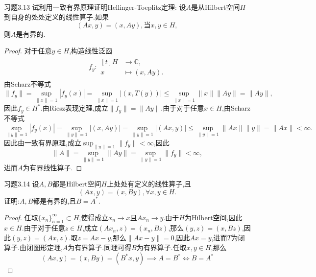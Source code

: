 \documentclass[lang = cn, scheme = chinese]{elegantbook}
\begin{document}
	\chapter{}
	
	\begin{proposition}{习题3.13}
		试利用一致有界原理证明Hellinger-Toeplitz定理:
		设$A$是从Hilbert空间$H$到自身的处处定义的线性算子.如果
		$$
		(Ax,y)=(x,Ay),\text{当}x,y\in H,
		$$
		则$A$是有界的.
	\end{proposition}
	
	\begin{proof}
		对于任意$y\in H $,构造线性泛函
		\begin{align*}
			f_y:\begin{aligned}[t]
				H &\longrightarrow \mathbb{C},\\
				x&\longmapsto (x,Ay).
			\end{aligned}
		\end{align*}
		由Scharz不等式
		$$
		\|f_y\|=\sup_{\|x\|=1}|f_y(x)|=\sup_{\|x\|=1}|(x,T(y))|\le \sup_{\|x\|=1}\|x\|\|Ay\|=\|Ay\|,
		$$
		因此$f_y\in H ^*$.由Riesz表现定理,成立$\|f_y\|=\|Ay\|$.由于对于任意$x\in H $,由Scharz不等式
		$$
		\sup_{\|y\|=1}|f_y(x)|
		=\sup_{\|y\|=1}|(x,Ay)|
		=\sup_{\|y\|=1}|(Ax,y)|
		\le\sup_{\|y\|=1}\|Ax\|\|y\|
		=\|Ax\|<\infty.
		$$
		因此由一致有界原理,成立$\displaystyle\sup_{\|y\|=1}\|f_y\|<\infty$,因此
		$$
		\|A\|=\sup_{\|y\|=1}\|Ay\|=\sup_{\|y\|=1}\|f_y\|<\infty,
		$$
		进而$A$为有界线性算子.
	\end{proof}
	
	\begin{proposition}{习题3.14}
		设$A,B$都是Hilbert空间$H$上处处有定义的线性算子,且
		$$
		(Ax,y)=(x,By),\forall x,y\in H.
		$$
		证明:$A,B$都是有界的,且$B=A^*$.
	\end{proposition}
	
	\begin{proof}
		任取$\{x_n\}_{n=1}^\infty\subset H $,使得成立$x_n\to x$且$Ax_n\to y$.由于$ H $为Hilbert空间,因此$x\in H $.由于对于任意$z\in H $,成立$(Ax_n,z)=(x_n,Bz)$,那么$(y,z)=(x,Bz)$,因此$(y,z)=(Ax,z)$.取$z=Ax-y$,那么$\|Ax-y\|=0$,因此$Ax=y$,进而$T$为闭算子.由闭图形定理,$A$为有界算子.同理可得$B$为有界算子.任取$x,y\in H $,那么
		$$
		(Ax,y)=(x,By)=(B^*x,y)\implies A=B^*\iff B=A^*
		$$
	\end{proof}

	\chapter{}
	
\end{document}
